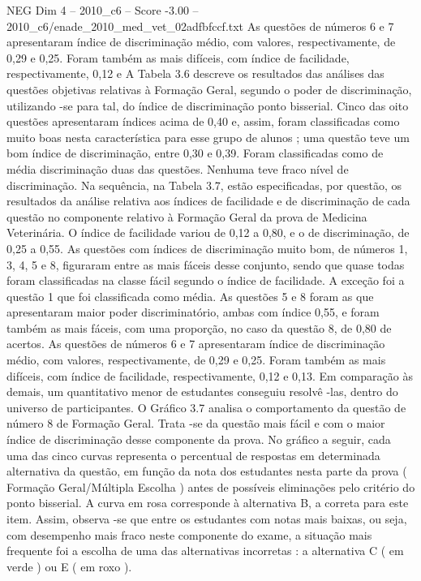 \begin{textsample}{NEG Dim 4 – 2010\_c6 – Score -3.00 – 2010\_c6/enade\_2010\_med\_vet\_02adfbfccf.txt}
As questões de números 6 e 7 apresentaram índice de discriminação médio, com valores, respectivamente, de 0,29 e 0,25.
Foram também as mais difíceis, com índice de facilidade, respectivamente, 0,12 e A Tabela 3.6 descreve os resultados das análises das questões objetivas relativas à Formação Geral, segundo o poder de discriminação, utilizando -se para tal, do índice de discriminação ponto bisserial.
Cinco das oito questões apresentaram índices acima de 0,40 e, assim, foram classificadas como muito boas nesta característica para esse grupo de alunos ; uma questão teve um bom índice de discriminação, entre 0,30 e 0,39.
Foram classificadas como de média discriminação duas das questões.
Nenhuma teve fraco nível de discriminação.
Na sequência, na Tabela 3.7, estão especificadas, por questão, os resultados da análise relativa aos índices de facilidade e de discriminação de cada questão no componente relativo à Formação Geral da prova de Medicina Veterinária.
O índice de facilidade variou de 0,12 a 0,80, e o de discriminação, de 0,25 a 0,55.
As questões com índices de discriminação muito bom, de números 1, 3, 4, 5 e 8, figuraram entre as mais fáceis desse conjunto, sendo que quase todas foram classificadas na classe fácil segundo o índice de facilidade.
A exceção foi a questão 1 que foi classificada como média.
As questões 5 e 8 foram as que apresentaram maior poder discriminatório, ambas com índice 0,55, e foram também as mais fáceis, com uma proporção, no caso da questão 8, de 0,80 de acertos.
As questões de números 6 e 7 apresentaram índice de discriminação médio, com valores, respectivamente, de 0,29 e 0,25.
Foram também as mais difíceis, com índice de facilidade, respectivamente, 0,12 e 0,13.
Em comparação às demais, um quantitativo menor de estudantes conseguiu resolvê -las, dentro do universo de participantes.
O Gráfico 3.7 analisa o comportamento da questão de número 8 de Formação Geral.
Trata -se da questão mais fácil e com o maior índice de discriminação desse componente da prova.
No gráfico a seguir, cada uma das cinco curvas representa o percentual de respostas em determinada alternativa da questão, em função da nota dos estudantes nesta parte da prova ( Formação Geral/Múltipla Escolha ) antes de possíveis eliminações pelo critério do ponto bisserial.
A curva em rosa corresponde à alternativa B, a correta para este item.
Assim, observa -se que entre os estudantes com notas mais baixas, ou seja, com desempenho mais fraco neste componente do exame, a situação mais frequente foi a escolha de uma das alternativas incorretas : a alternativa C ( em verde ) ou E ( em roxo ).

\end{textsample}
